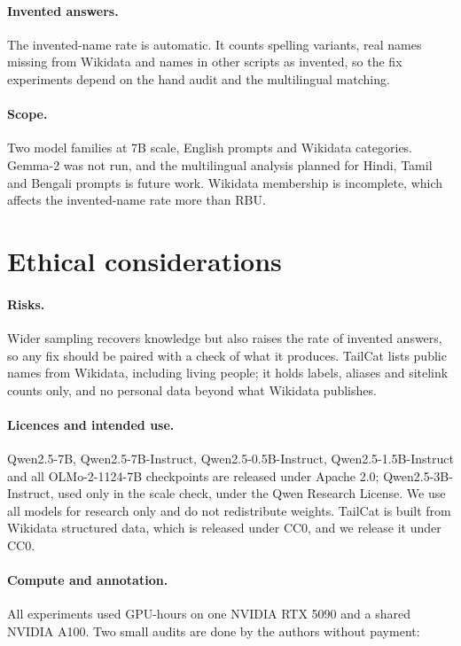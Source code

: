 \documentclass[11pt]{article}
\begin{document}
\paragraph{Invented answers.} The invented-name rate is automatic. It counts spelling variants, real names missing from Wikidata and names in other scripts as invented, so the fix experiments depend on the hand audit and the multilingual matching.

\paragraph{Scope.} Two model families at 7B scale, English prompts and Wikidata categories. \pdThirdFamily{} Gemma-2 was not run, and the multilingual analysis planned for Hindi, Tamil and Bengali prompts is future work. Wikidata membership is incomplete, which affects the invented-name rate more than RBU.

\section*{Ethical considerations}

\paragraph{Risks.} Wider sampling recovers knowledge but also raises the rate of invented answers, so any fix should be paired with a check of what it produces. TailCat lists public names from Wikidata, including living people; it holds labels, aliases and sitelink counts only, and no personal data beyond what Wikidata publishes.

\paragraph{Licences and intended use.} Qwen2.5-7B, Qwen2.5-7B-Instruct, Qwen2.5-0.5B-Instruct, Qwen2.5-1.5B-Instruct and all OLMo-2-1124-7B checkpoints are released under Apache 2.0; Qwen2.5-3B-Instruct, used only in the scale check, under the Qwen Research License. We use all models for research only and do not redistribute weights. TailCat is built from Wikidata structured data, which is released under CC0, and we release it under CC0.

\paragraph{Compute and annotation.} All experiments used \reproGpuHours{} GPU-hours on one NVIDIA RTX 5090 and a shared NVIDIA A100. Two small audits are done by the authors without payment: \pdAuditDetails{}
\end{document}
